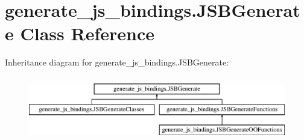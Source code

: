 \hypertarget{classgenerate__js__bindings_1_1_j_s_b_generate}{\section{generate\-\_\-js\-\_\-bindings.\-J\-S\-B\-Generate Class Reference}
\label{classgenerate__js__bindings_1_1_j_s_b_generate}
}
Inheritance diagram for generate\-\_\-js\-\_\-bindings.\-J\-S\-B\-Generate\-:\begin{figure}[H]
\begin{center}
\leavevmode
\includegraphics[height=2.857143cm]{classgenerate__js__bindings_1_1_j_s_b_generate}
\end{center}
\end{figure}
